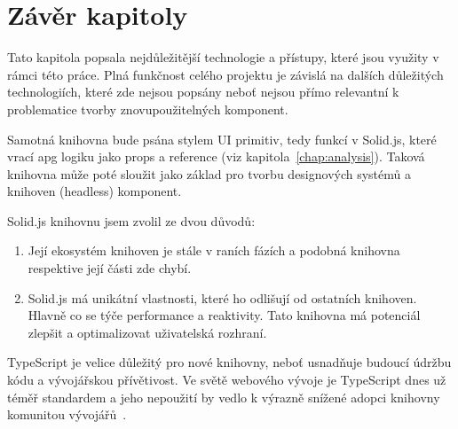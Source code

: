 \section{Závěr kapitoly}

Tato kapitola popsala nejdůležitější technologie a přístupy, které jsou využity v rámci této práce.
Plná funkčnost celého projektu je závislá na dalších důležitých technologiích, které zde nejsou popsány neboť nejsou přímo relevantní k problematice tvorby znovupoužitelných komponent.

Samotná knihovna bude psána stylem UI primitiv, tedy funkcí v Solid.js, které vrací \gls{apg} logiku jako props a reference (viz kapitola~\ref{chap:analysis}).
Taková knihovna může poté sloužit jako základ pro tvorbu designových systémů a knihoven (headless) komponent.

Solid.js knihovnu jsem zvolil ze dvou důvodů:

\begin{enumerate}
      \item Její ekosystém knihoven je stále v raních fázích a podobná knihovna respektive její části zde chybí.
      \item Solid.js má unikátní vlastnosti, které ho odlišují od ostatních knihoven.
            Hlavně co se týče performance a reaktivity.
            Tato knihovna má potenciál zlepšit a optimalizovat uživatelská rozhraní.
\end{enumerate}

TypeScript je velice důležitý pro nové knihovny, neboť usnadňuje budoucí údržbu kódu a vývojářskou přívětivost.
Ve světě webového vývoje je TypeScript dnes už téměř standardem a jeho nepoužití by vedlo k výrazně snížené adopci knihovny komunitou vývojářů~\cite{stateofjs-2022}.

